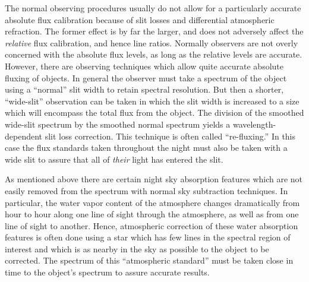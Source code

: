 The normal observing procedures usually do not allow for a particularly
accurate absolute flux calibration because of slit losses and differential
atmospheric refraction.  The former effect is by far the larger, and does not
adversely affect the {\it relative} flux calibration, and hence line ratios.
Normally observers are not overly concerned with the absolute flux levels, as
long as the relative levels are accurate. However, there are observing
techniques which allow quite accurate absolute fluxing of objects.  In general
the observer must take a spectrum of the object using a ``normal'' slit width
to retain spectral resolution.  But then a shorter, ``wide-slit'' observation
can be taken in which the slit width is increased to a size which will
encompass the total flux from the object.  The division of the smoothed
wide-slit spectrum by the smoothed normal spectrum yields a
wavelength-dependent slit loss correction.  This technique is often called
``re-fluxing.''  In this case the flux standards taken throughout the night
must also be taken with a wide slit to assure that all of {\it their} light
has entered the slit.

As mentioned above there are certain night sky absorption features which are
not easily removed from the spectrum with normal sky subtraction techniques.
In particular, the water vapor content of the atmosphere changes dramatically
from hour to hour along one line of sight through the atmosphere, as well as
from one line of sight to another.  Hence, atmospheric correction of these
water absorption features is often done using a star which has few lines in
the spectral region of interest and which is as nearby in the sky as possible
to the object to be corrected.  The spectrum of this ``atmospheric standard''
must be taken close in time to the object's spectrum to assure accurate
results.

%
